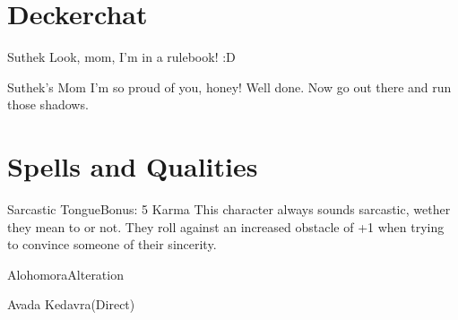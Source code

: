 \documentclass{ShadowTeXSR5}
\begin{document}
\section{Deckerchat}
\lipsum[1-5]
\begin{deckercomment}{Suthek}
Look, mom, I'm in a rulebook! :D
\end{deckercomment}
\begin{deckercomment}{Suthek's Mom}
I'm so proud of you, honey! Well done. Now go out there and run those shadows.
\end{deckercomment}
\section{Spells and Qualities}
\lipsum[1]
\begin{spell}{Sarcastic Tongue}{Bonus: 5 Karma}
This character always sounds sarcastic, wether they mean to or not. They roll against an increased obstacle of +1 when trying to convince someone of their sincerity.
\end{spell}
\begin{spell}{Alohomora}{Alteration}
\lipsum[2]
\end{spell}
\begin{spell}{Avada Kedavra}{(Direct)}
\lipsum[3]
\end{spell}
\end{document}
